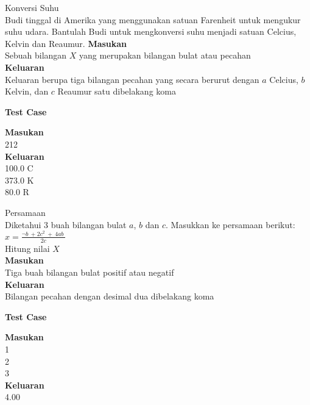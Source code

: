 \begin{permasalahan}{Konversi Suhu}\\
\label{prob:KonversiSuhu}
	Budi tinggal di Amerika yang menggunakan satuan  Farenheit untuk mengukur suhu udara. Bantulah Budi untuk mengkonversi suhu menjadi satuan Celcius, Kelvin dan Reaumur. 
	\textbf{Masukan}\\
	Sebuah bilangan $X$ yang merupakan bilangan bulat atau pecahan\\
	\textbf{Keluaran}\\
	Keluaran berupa tiga bilangan pecahan yang secara berurut dengan $a$ Celcius, $b$ Kelvin, dan $c$ Reaumur satu dibelakang koma
 	\begin{center}
	\textbf{Test Case}\\
	\end{center}
	\textbf{Masukan}\\
	212\\
	\textbf{Keluaran}\\
	100.0 C\\
	373.0 K\\
	80.0 R
\end{permasalahan}

\begin{permasalahan}{Persamaan}\\
\label{prob:Persamaan}
	Diketahui 3 buah bilangan bulat $a$, $b$ dan $c$. Masukkan ke persamaan berikut: \\
	
		 $x = \frac{\neg b\ +2c^{2}\ +\ 4ab\ }{2c}$ \\
	
	Hitung nilai $X$ \\
	\textbf{Masukan}\\
	Tiga buah bilangan bulat positif atau negatif \\
	\textbf{Keluaran}\\
	Bilangan pecahan dengan desimal dua dibelakang koma \\
 	\begin{center}
	\textbf{Test Case}\\
	\end{center}
	\textbf{Masukan}\\
	1\\
	2\\
	3\\
	\textbf{Keluaran}\\
	4.00\\
\end{permasalahan}

